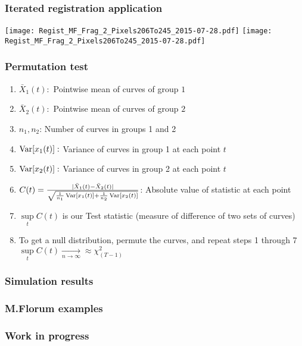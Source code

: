 \documentclass[10pt,dvipsnames,table, notes]{beamer}
\begin{document}
\begin{frame}
\frametitle{Iterated registration application}
\begin{center}
\texttt{[image: Regist\_MF\_Frag\_2\_Pixels206To245\_2015-07-28.pdf]}
\texttt{[image: Regist\_MF\_Frag\_2\_Pixels206To245\_2015-07-28.pdf]}
\end{center}
\end{frame}

\begin{frame}
\frametitle{Permutation test}
\begin{enumerate}
\item $\bar{X}_1(t): $ Pointwise mean of curves of group $1$
\item $\bar{X}_2(t): $ Pointwise mean of curves of group $2$
\item $n_1, n_2$: Number of curves in groups 1 and 2
\item $\operatorname{Var}[x_1(t)]: $ Variance of curves in group 1 at each point $t$ 
\item $\operatorname{Var}[x_2(t)]: $ Variance of curves in group 2 at each point $t$ 
\item $C(t) = \frac{|\bar{X}_1(t) - \bar{X}_2(t)|}{\sqrt{\frac{1}{n_1}\operatorname{Var}[x_1(t)] + 
\frac{1}{n_2}\operatorname{Var}[x_2(t)]}}$: Absolute value of statistic at each point
\item $\underset{t}{\sup}C(t)$ is our Test statistic (measure of difference of two sets of curves)
\item To get a null distribution, permute the curves, and repeat steps 1 through 7
$\underset{t}{\sup}C(t) \underset{n \to \infty}{\rightarrow} \approx \chi^2_{(T-1)}$
\end{enumerate}
\end{frame}

\begin{frame}
\frametitle{Simulation results}

\end{frame}

\begin{frame}
\frametitle{M.Florum examples}

\end{frame}

\begin{frame}
\frametitle{Work in progress}

\end{frame}
\end{document}
